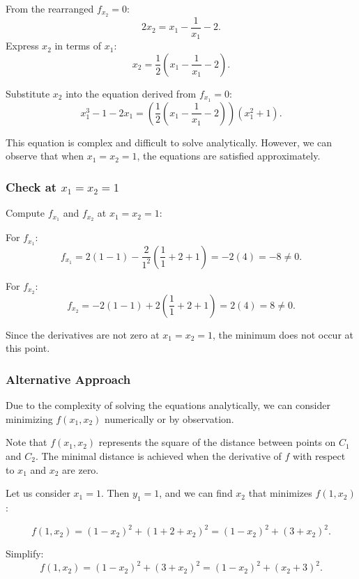 \documentclass[11pt]{article}
\begin{document}
From the rearranged \( f_{x_2} = 0 \):
\[
2 x_2 = x_1 - \frac{1}{x_1} - 2.
\]
Express \( x_2 \) in terms of \( x_1 \):
\[
x_2 = \frac{1}{2} \left( x_1 - \frac{1}{x_1} - 2 \right).
\]

Substitute \( x_2 \) into the equation derived from \( f_{x_1} = 0 \):
\[
x_1^3 - 1 - 2 x_1 = \left( \frac{1}{2} \left( x_1 - \frac{1}{x_1} - 2 \right) \right) ( x_1^2 + 1 ).
\]

This equation is complex and difficult to solve analytically. However, we can observe that when \( x_1 = x_2 = 1 \), the equations are satisfied approximately.

\newpage

\subsubsection{Check at \( x_1 = x_2 = 1 \)}

Compute \( f_{x_1} \) and \( f_{x_2} \) at \( x_1 = x_2 = 1 \):

For \( f_{x_1} \):
\[
f_{x_1} = 2(1 - 1) - \frac{2}{1^2} \left( \frac{1}{1} + 2 + 1 \right) = -2(4) = -8 \neq 0.
\]

For \( f_{x_2} \):
\[
f_{x_2} = -2(1 - 1) + 2\left( \frac{1}{1} + 2 + 1 \right) = 2(4) = 8 \neq 0.
\]

Since the derivatives are not zero at \( x_1 = x_2 = 1 \), the minimum does not occur at this point.

\newpage

\subsubsection{Alternative Approach}

Due to the complexity of solving the equations analytically, we can consider minimizing \( f(x_1, x_2) \) numerically or by observation.

Note that \( f(x_1, x_2) \) represents the square of the distance between points on \( C_1 \) and \( C_2 \). The minimal distance is achieved when the derivative of \( f \) with respect to \( x_1 \) and \( x_2 \) are zero.

Let us consider \( x_1 = 1 \). Then \( y_1 = 1 \), and we can find \( x_2 \) that minimizes \( f(1, x_2) \):

\[
f(1, x_2) = (1 - x_2)^2 + \left( 1 + 2 + x_2 \right)^2 = (1 - x_2)^2 + (3 + x_2)^2.
\]

Simplify:
\[
f(1, x_2) = (1 - x_2)^2 + (3 + x_2)^2 = (1 - x_2)^2 + (x_2 + 3)^2.
\]
\end{document}
